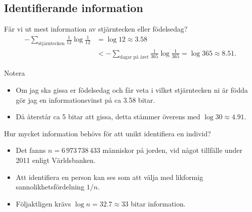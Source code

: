 \documentclass{beamer}
\theoremstyle{definition}
\begin{document}
\subsection{Identifierande information}

\begin{frame}{\insertsubsectionhead}
  \begin{example}
    Får vi ut mest information av stjärntecken eller födelsedag?
    \begin{align*}
      -\sum_{\text{stjärntecken}} \frac{1}{12} \log\frac{1}{12} &= \log 12 
      \approx 3.58 \\
      &< -\sum_{\text{dagar på året}} \frac{1}{365} \log\frac{1}{365} = \log 
      365 \approx 8.51.
    \end{align*}
  \end{example}

  \begin{block}{Notera}
    \begin{itemize}
      \item Om jag ska gissa er födelsedag och får veta i vilket stjärntecken 
        ni är födda gör jag en informationsvinst på ca 3.58 bitar.
      \item Då återstår ca 5 bitar att gissa, detta stämmer överens med \(\log 
        30\approx 4.91\).
    \end{itemize}
  \end{block}
\end{frame}

\begin{frame}{\insertsubsectionhead}
  \begin{center}
    Hur mycket information behövs för att unikt identifiera en individ?
  \end{center}
\end{frame}

\begin{frame}{\insertsubsectionhead}
  \begin{itemize}
    \item Det fanns \(n = 6\,973\,738\,433\) människor på jorden, vid något 
      tillfälle under 2011 enligt Världsbanken.

    \item Att identifiera en person kan ses som att välja med likformig 
      sannolikhetsfördelning \(1/n\).

    \item Följaktligen krävs \(\log n = 32.7\approx 33\) bitar information.

  \end{itemize}
\end{frame}
\end{document}
